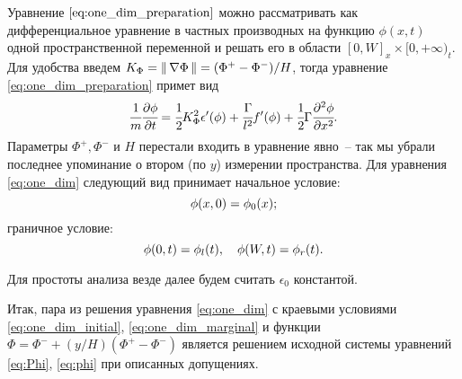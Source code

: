 Уравнение $\eqref{eq:one_dim_preparation}$ можно рассматривать как дифференциальное уравнение в частных производных на функцию $\phi(x, t)$ одной пространственной переменной и решать его в области $[0, W]_x \times [0, +\infty)_t$. Для удобства введем $K_\Phi \hm = \norm{\nabla \Phi} = (\Phi^+ - \Phi^-) / H$, тогда уравнение \eqref{eq:one_dim_preparation} примет вид
\begin{equation}
	\cfrac{1}{m} \cfrac{\partial \phi}{\partial t} = \cfrac{1}{2} K_\Phi^2 \epsilon'(\phi) + \cfrac{\Gamma}{l^2} f'(\phi) + \cfrac{1}{2} \Gamma \cfrac{\partial^2 \phi}{\partial x^2} {\text{.}}
	\label{eq:one_dim}
\end{equation}
Параметры $\Phi^+, \Phi^-$ и $H$ перестали входить в уравнение явно~-- так мы убрали последнее упоминание о втором (по $y$) измерении пространства. Для уравнения \eqref{eq:one_dim} следующий вид принимает начальное условие:
\begin{equation}
	\phi(x, 0) = \phi_0(x) {\text{;}}
	\label{eq:one_dim_initial}
\end{equation}
граничное условие:
\begin{equation}
	\phi(0, t) = \phi_l(t), \quad \phi(W, t) = \phi_r(t) {\text{.}}
	\label{eq:one_dim_marginal}
\end{equation}

Для простоты анализа везде далее будем считать $\epsilon_0$ константой.

Итак, пара из решения уравнения \eqref{eq:one_dim} с краевыми условиями \eqref{eq:one_dim_initial}, \eqref{eq:one_dim_marginal} и функции $\Phi = \Phi^- + (y / H)(\Phi^+ - \Phi^-)$ является решением исходной системы уравнений \eqref{eq:Phi}, \eqref{eq:phi} при описанных допущениях.